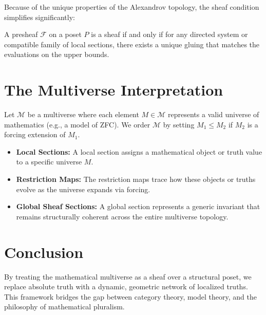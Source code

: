\documentclass[11pt,oneside]{article}
\begin{document}
Because of the unique properties of the Alexandrov topology, the sheaf condition simplifies significantly:
\begin{proposition}
A presheaf $\mathcal{F}$ on a poset $P$ is a sheaf if and only if for any directed system or compatible family of local sections, there exists a unique gluing that matches the evaluations on the upper bounds.
\end{proposition}

\section{The Multiverse Interpretation}
Let $\mathcal{M}$ be a multiverse where each element $M \in \mathcal{M}$ represents a valid universe of mathematics (e.g., a model of ZFC). We order $\mathcal{M}$ by setting $M_1 \le M_2$ if $M_2$ is a forcing extension of $M_1$.

\begin{itemize}
    \item \textbf{Local Sections:} A local section assigns a mathematical object or truth value to a specific universe $M$.
    \item \textbf{Restriction Maps:} The restriction maps trace how these objects or truths evolve as the universe expands via forcing.
    \item \textbf{Global Sheaf Sections:} A global section represents a generic invariant that remains structurally coherent across the entire multiverse topology.
\end{itemize}

\section{Conclusion}
By treating the mathematical multiverse as a sheaf over a structural poset, we replace absolute truth with a dynamic, geometric network of localized truths. This framework bridges the gap between category theory, model theory, and the philosophy of mathematical pluralism.
\end{document}
